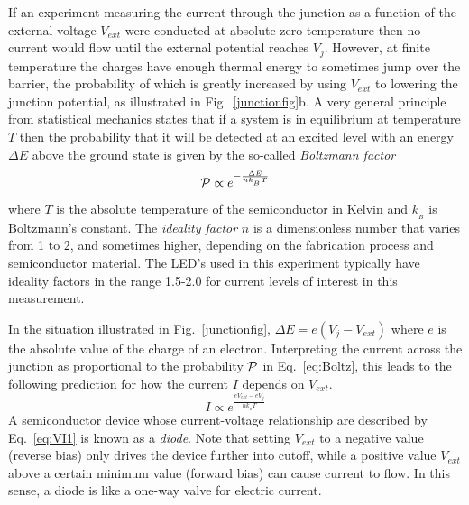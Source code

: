 \documentclass{revtex4}
\begin{document}
If an experiment measuring the current through the junction as a function
of the external voltage $V_{ext}$ were conducted at absolute zero temperature
then no current would flow until the external potential reaches $V_j$.
However, at finite temperature the charges have enough thermal energy to
sometimes jump over the barrier, the probability of which is greatly increased
by using $V_{ext}$ to lowering the junction potential, as illustrated in
Fig.~\ref{junctionfig}b.  A very general principle from statistical mechanics
states that if a system is in equilibrium at temperature $T$ then the
probability that it will be detected at an excited level with an energy
$\Delta E$ above the ground state is given by the so-called {\em
Boltzmann factor}
\begin{equation}
{\cal P} \propto e^{-\frac{\Delta E}{nk_{_B} T}}
\label{eq:Boltz}
\end{equation}
where $T$ is the absolute temperature of the semiconductor in Kelvin
and $k_{_B}$ is Boltzmann's constant.  The {\em ideality factor} $n$
is a dimensionless number that varies from 1 to 2, and sometimes higher,
depending on the fabrication process and semiconductor material.  The
LED's used in this experiment typically have ideality factors in the
range 1.5-2.0 for current levels of interest in this measurement.

In the situation illustrated in Fig.~\ref{junctionfig},
$\Delta E = e(V_j-V_{ext})$ where $e$ is the absolute value of the charge
of an electron.  Interpreting the current across the junction
as proportional to the probability ${\cal P}$ in Eq.~\ref{eq:Boltz}, this
leads to the following prediction for how the current $I$ depends on $V_{ext}$.
\begin{equation}
I \propto e^{\frac{eV_{ext}-eV_j}{nk_{_B} T}}
\label{eq:VI1}
\end{equation}
A semiconductor device whose current-voltage relationship are described
by Eq.~\ref{eq:VI1} is known as a {\em diode}.  Note that setting $V_{ext}$
to a negative value (reverse bias) only drives the device further into
cutoff, while a positive value $V_{ext}$ above a certain minimum value
(forward bias) can cause current to flow.  In this sense, a diode is like
a one-way valve for electric current.
\end{document}
